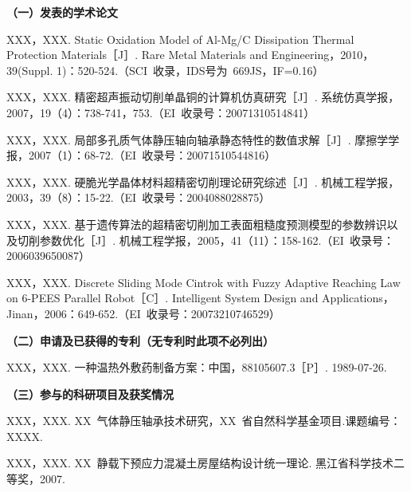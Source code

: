 
\begin{publication}
  \noindent\songti\textbf{（一）发表的学术论文}
  \begin{publist}
    \item	XXX，XXX. Static Oxidation Model of Al-Mg/C Dissipation Thermal Protection Materials［J］. Rare Metal Materials and Engineering，2010，39(Suppl. 1)：520-524.（SCI~收录，IDS号为~669JS，IF=0.16）
    \item XXX，XXX. 精密超声振动切削单晶铜的计算机仿真研究［J］. 系统仿真学报，2007，19（4）：738-741，753.（EI~收录号：20071310514841）
    \item XXX，XXX. 局部多孔质气体静压轴向轴承静态特性的数值求解［J］. 摩擦学学报，2007（1）：68-72.（EI~收录号：20071510544816）
    \item XXX，XXX. 硬脆光学晶体材料超精密切削理论研究综述［J］. 机械工程学报，2003，39（8）：15-22.（EI~收录号：2004088028875）
    \item XXX，XXX. 基于遗传算法的超精密切削加工表面粗糙度预测模型的参数辨识以及切削参数优化［J］. 机械工程学报，2005，41（11）：158-162.（EI~收录号：2006039650087）
    \item XXX，XXX. Discrete Sliding Mode Cintrok with Fuzzy Adaptive Reaching Law on 6-PEES Parallel Robot［C］. Intelligent System Design and Applications，Jinan，2006：649-652.（EI~收录号：20073210746529）
  \end{publist}

  \noindent\songti\textbf{（二）申请及已获得的专利（无专利时此项不必列出）}
  \begin{publist}
    \item XXX，XXX. 一种温热外敷药制备方案：中国，88105607.3［P］. 1989-07-26.
  \end{publist}

  \noindent\songti\textbf{（三）参与的科研项目及获奖情况}
  \begin{publist}
    \item	XXX，XXX. XX~气体静压轴承技术研究，XX~省自然科学基金项目.课题编号：XXXX.
    \item XXX，XXX. XX~静载下预应力混凝土房屋结构设计统一理论. 黑江省科学技术二等奖，2007.
  \end{publist}
\end{publication}
